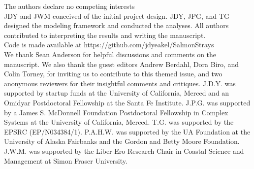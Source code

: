 \documentclass{revtex4}
\begin{document}
 The authors declare no competing interests
\\
 JDY and JWM conceived of the initial project design. JDY, JPG, and TG designed the modeling framework and conducted the analyses. All authors contributed to interpreting the results and writing the manuscript.
\\
 Code is made available at https://github.com/jdyeakel/SalmonStrays
\\
 We thank Sean Anderson for helpful discussions and comments on the manuscript. We also thank the guest editors Andrew Berdahl, Dora Biro, and Colin Torney, for inviting us to contribute to this themed issue, and two anonymous reviewers for their insightful comments and critiques. J.D.Y. was supported by startup funds at the University of California, Merced and an Omidyar Postdoctoral Fellowship at the Santa Fe Institute. J.P.G. was supported by a James S. McDonnell Foundation Postdoctoral Fellowship in Complex Systems at the University of California, Merced. T.G. was supported by the EPSRC (EP/N034384/1). P.A.H.W. was supported by the UA Foundation at the University of Alaska Fairbanks and the Gordon and Betty Moore Foundation. J.W.M. was supported by the Liber Ero Research Chair in Coastal Science and Management at Simon Fraser University.

% 
\end{document}
